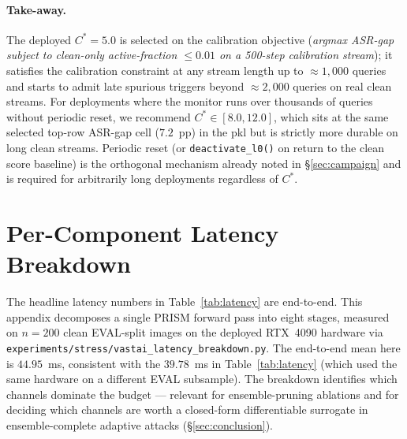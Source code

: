 \paragraph{Take-away.}
The deployed $C^* = 5.0$ is selected on the calibration objective
(\textit{argmax ASR-gap subject to clean-only active-fraction
$\leq 0.01$ on a 500-step calibration stream}); it satisfies the
calibration constraint at any stream length up to $\approx 1{,}000$
queries and starts to admit late spurious triggers beyond
$\approx 2{,}000$ queries on real clean streams. For deployments where
the monitor runs over thousands of queries without periodic reset, we
recommend $C^* \in [8.0, 12.0]$, which sits at the same selected
top-row ASR-gap cell ($7.2$~pp) in the pkl but is strictly more durable
on long clean streams. Periodic reset (or \texttt{deactivate\_l0()} on
return to the clean score baseline) is the orthogonal mechanism already
noted in \S\ref{sec:campaign} and is required for arbitrarily long
deployments regardless of $C^*$.


\section{Per-Component Latency Breakdown}
\label{app:latency_breakdown}

The headline latency numbers in Table~\ref{tab:latency} are end-to-end.
This appendix decomposes a single PRISM forward pass into eight stages,
measured on $n{=}200$ clean EVAL-split images on the deployed
RTX~4090 hardware via
\texttt{experiments/stress/vastai\_latency\_breakdown.py}. The
end-to-end mean here is $44.95$~ms, consistent with the
$39.78$~ms in Table~\ref{tab:latency} (which used the same hardware on
a different EVAL subsample). The breakdown identifies which channels
dominate the budget --- relevant for ensemble-pruning ablations and
for deciding which channels are worth a closed-form differentiable
surrogate in ensemble-complete adaptive attacks
(\S\ref{sec:conclusion}).


